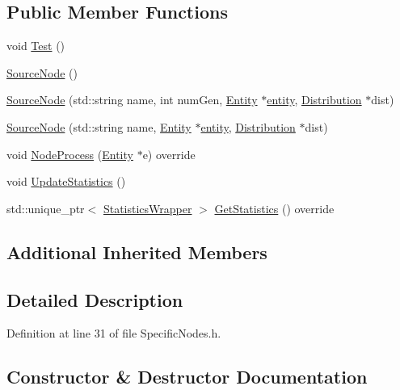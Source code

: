 \subsection*{Public Member Functions}
\begin{DoxyCompactItemize}
\item 
void \hyperlink{class_source_node_acb96be478aebf6c2badd1c5d1164e24c}{Test} ()
\item 
\hyperlink{class_source_node_abb26d83cef2e50b0add1499a05e6905d}{Source\+Node} ()
\item 
\hyperlink{class_source_node_aad28db9c905ffdccd8013bc1e4481848}{Source\+Node} (std\+::string name, int num\+Gen, \hyperlink{class_entity}{Entity} $\ast$\hyperlink{_entity_8h_ad79a57ed3105eb60d991a1aeb4a9dc44a428e8fcd53019fa239fa3419261e499e}{entity}, \hyperlink{class_distribution}{Distribution} $\ast$dist)
\item 
\hyperlink{class_source_node_ab287553b2a359c578f4579bd467806a2}{Source\+Node} (std\+::string name, \hyperlink{class_entity}{Entity} $\ast$\hyperlink{_entity_8h_ad79a57ed3105eb60d991a1aeb4a9dc44a428e8fcd53019fa239fa3419261e499e}{entity}, \hyperlink{class_distribution}{Distribution} $\ast$dist)
\item 
void \hyperlink{class_source_node_a666a65bd2424a8f56d8f08260c09c0b4}{Node\+Process} (\hyperlink{class_entity}{Entity} $\ast$e) override
\item 
void \hyperlink{class_source_node_a6c5037fd886362d56b7ce04094433510}{Update\+Statistics} ()
\item 
std\+::unique\+\_\+ptr$<$ \hyperlink{class_generic_node_1_1_statistics_wrapper}{Statistics\+Wrapper} $>$ \hyperlink{class_source_node_a0aea882fe808d9da6d506653be166e73}{Get\+Statistics} () override
\end{DoxyCompactItemize}
\subsection*{Additional Inherited Members}


\subsection{Detailed Description}


Definition at line 31 of file Specific\+Nodes.\+h.



\subsection{Constructor \& Destructor Documentation}
\mbox{\label{class_source_node_abb26d83cef2e50b0add1499a05e6905d}} 
